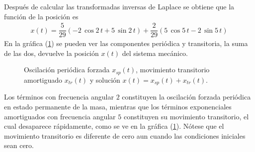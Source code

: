 Después de calcular las transformadas inversas de Laplace se obtiene que la función de la posición es
\begin{align*}
x(t) = \dfrac{5}{29} ( - 2 \, \cos 2 \, t  + 5 \, \sin 2 \, t ) + \dfrac{2}{29} (5 \, \cos 5 \, t - 2 \, \sin 5 \, t)
\end{align*}
En la gráfica (\ref{fig:figura_07_03_03}) se pueden ver las componentes periódica y transitoria, la suma de las dos, devuelve la posición $x(t)$ del sistema mecánico.
\begin{figure}[!ht]
    \centering
    
    \caption{Oscilación periódica forzada $x_{sp}(t)$, movimiento transitorio amortiguado $x_{tr}(t)$ y solución $x(t) =x_{sp}(t) + x_{tr}(t)$.}
    \label{fig:figura_07_03_03}
\end{figure}
Los términos con frecuencia angular $2$ constituyen la oscilación forzada periódica en estado permanente de la masa, mientras que los términos exponenciales amortiguados con frecuencia angular $5$ constituyen su movimiento transitorio, el cual desaparece rápidamente, como se ve en la gráfica (\ref{fig:figura_07_03_03}). Nótese que el movimiento transitorio es diferente de cero aun cuando las condiciones iniciales sean cero.
